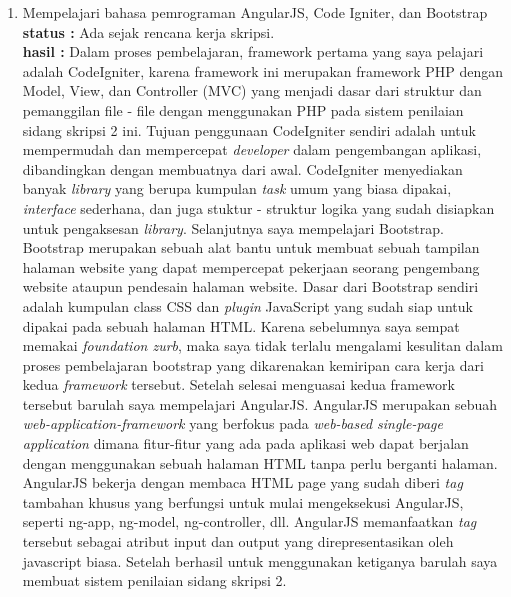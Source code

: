\documentclass[a4paper,twoside]{article}
\begin{document}
\begin{enumerate}
		\item Mempelajari bahasa pemrograman AngularJS, Code Igniter, dan Bootstrap\\
		{\bf status :} Ada sejak rencana kerja skripsi.\\
		{\bf hasil :} Dalam proses pembelajaran, framework pertama yang saya pelajari adalah CodeIgniter, karena framework ini merupakan framework PHP dengan Model, View, dan Controller (MVC) yang menjadi dasar dari struktur dan pemanggilan file - file dengan menggunakan PHP pada sistem penilaian sidang skripsi 2 ini. Tujuan penggunaan CodeIgniter sendiri adalah untuk mempermudah dan mempercepat \textit{developer} dalam pengembangan aplikasi, dibandingkan dengan membuatnya dari awal. CodeIgniter menyediakan banyak \textit{library} yang berupa kumpulan \textit{task} umum yang biasa dipakai, \textit{interface} sederhana, dan juga stuktur - struktur logika yang sudah disiapkan untuk pengaksesan \textit{library}.
		\linebreak
		Selanjutnya saya mempelajari Bootstrap. Bootstrap merupakan sebuah alat bantu untuk membuat sebuah tampilan halaman website yang dapat mempercepat pekerjaan seorang pengembang website ataupun pendesain halaman website. Dasar dari Bootstrap sendiri adalah kumpulan class CSS dan \textit{plugin} JavaScript yang sudah siap untuk dipakai pada sebuah halaman HTML. Karena sebelumnya saya sempat memakai \textit{foundation zurb}, maka saya tidak terlalu mengalami kesulitan dalam proses pembelajaran bootstrap yang dikarenakan kemiripan cara kerja dari kedua \textit{framework} tersebut.
		\linebreak
		Setelah selesai menguasai kedua framework tersebut barulah saya mempelajari AngularJS. AngularJS merupakan sebuah \textit{web-application-framework} yang berfokus pada \textit{web-based single-page application} dimana fitur-fitur yang ada pada aplikasi web dapat berjalan dengan menggunakan sebuah halaman HTML tanpa perlu berganti halaman. AngularJS bekerja dengan membaca HTML page yang sudah diberi \textit{tag} tambahan khusus yang berfungsi untuk mulai mengeksekusi AngularJS, seperti ng-app, ng-model, ng-controller, dll. AngularJS memanfaatkan \textit{tag} tersebut sebagai atribut input dan output yang direpresentasikan oleh javascript biasa. 
		Setelah berhasil untuk menggunakan ketiganya barulah saya membuat sistem penilaian sidang skripsi 2.


\end{enumerate}
\end{document}
